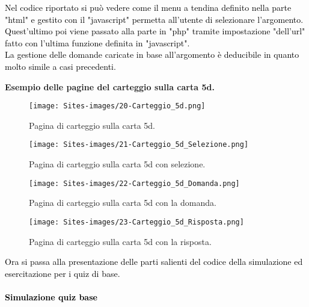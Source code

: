\textcolor{black}{Nel codice riportato si può vedere come il menu a tendina definito nella parte "html" e gestito con il "javascript" permetta all'utente di selezionare l'argomento. Quest'ultimo poi viene passato alla parte in "php" tramite impostazione "dell'url" fatto con l'ultima funzione definita in "javascript".\\
La gestione delle domande caricate in base all'argomento è deducibile in quanto molto simile a casi precedenti.}\\

\begin{center}
	\textbf{Esempio delle pagine del carteggio sulla carta 5d.}
\end{center}

\begin{figure}[h]
	\begin{center}
		\texttt{[image: Sites-images/20-Carteggio\_5d.png]}
		\caption{Pagina di carteggio sulla carta 5d.}
	\end{center}
\end{figure}

\begin{figure}[h]
	\begin{center}
		\texttt{[image: Sites-images/21-Carteggio\_5d\_Selezione.png]}
		\caption{Pagina di carteggio sulla carta 5d con selezione.}
	\end{center}
\end{figure}

\begin{figure}[h]
	\begin{center}
		\texttt{[image: Sites-images/22-Carteggio\_5d\_Domanda.png]}
		\caption{Pagina di carteggio sulla carta 5d con la domanda.}
	\end{center}
\end{figure}

\begin{figure}[h]
	\begin{center}
		\texttt{[image: Sites-images/23-Carteggio\_5d\_Risposta.png]}
		\caption{Pagina di carteggio sulla carta 5d con la risposta.}
	\end{center}
\end{figure}

\textcolor{black}{Ora si passa alla presentazione delle parti salienti del codice della simulazione ed esercitazione per i quiz di base.}\\

\paragraph{\textcolor{black}{Simulazione quiz base}}\leavevmode\\

